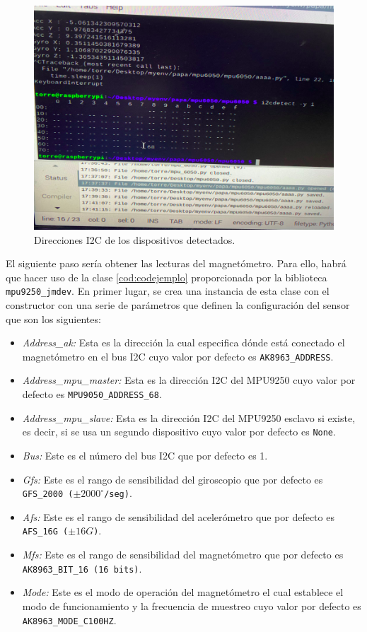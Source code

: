 \begin{figure}[H]
  \centering
  \includegraphics[scale=0.3]{figs/bus} %
  \caption{ Direcciones I2C de los dispositivos detectados.}
  \label{fig:bus}
\end{figure}

El siguiente paso sería obtener las lecturas del magnetómetro. Para ello, habrá que hacer uso de la clase \ref{cod:codejemplo} proporcionada por la biblioteca \texttt{mpu9250\_jmdev}. En primer lugar, se crea una instancia de esta clase con el constructor con una serie de parámetros que definen la configuración del sensor que son los siguientes:

\begin{itemize}
 \item \textit{Address\_ak:} Esta es la dirección la cual especifica dónde está conectado el magnetómetro en el bus I2C cuyo valor por defecto es \texttt{AK8963\_ADDRESS}.
 \item \textit{Address\_mpu\_master:} Esta es la dirección I2C del MPU9250 cuyo valor por defecto es \texttt{MPU9050\_ADDRESS\_68}.
 \item \textit{Address\_mpu\_slave:} Esta es la dirección I2C del MPU9250 esclavo si existe, es decir, si se usa un segundo dispositivo cuyo valor por defecto es \texttt{None}.
 \item \textit{Bus:} Este es el número del bus I2C que por defecto es 1.
 \item \textit{Gfs:} Este es el rango de sensibilidad del giroscopio que por defecto es \texttt{GFS\_2000 ($\pm 2000^\circ$/seg)}.
 \item \textit{Afs:} Este es el rango de sensibilidad del acelerómetro que por defecto es \texttt{AFS\_16G ($\pm 16G$)}.
 \item \textit{Mfs:} Este es el rango de sensibilidad del magnetómetro que por defecto es \texttt{AK8963\_BIT\_16 (16 bits)}.
 \item \textit{Mode:} Este es el modo de operación del magnetómetro el cual establece el modo de funcionamiento y la frecuencia de muestreo cuyo valor por defecto es \texttt{AK8963\_MODE\_C100HZ}.
\end{itemize}


